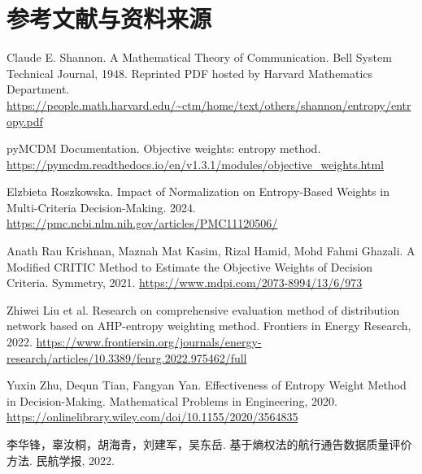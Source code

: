 \documentclass[UTF8,a4paper,12pt]{ctexart}
\begin{document}
\section*{参考文献与资料来源}
\begin{enumerate}[label={[\arabic*]}]
  \item Claude E. Shannon. A Mathematical Theory of Communication. Bell System Technical Journal, 1948. Reprinted PDF hosted by Harvard Mathematics Department. \url{https://people.math.harvard.edu/~ctm/home/text/others/shannon/entropy/entropy.pdf}
  \item pyMCDM Documentation. Objective weights: entropy method. \url{https://pymcdm.readthedocs.io/en/v1.3.1/modules/objective_weights.html}
  \item Elzbieta Roszkowska. Impact of Normalization on Entropy-Based Weights in Multi-Criteria Decision-Making. 2024. \url{https://pmc.ncbi.nlm.nih.gov/articles/PMC11120506/}
  \item Anath Rau Krishnan, Maznah Mat Kasim, Rizal Hamid, Mohd Fahmi Ghazali. A Modified CRITIC Method to Estimate the Objective Weights of Decision Criteria. Symmetry, 2021. \url{https://www.mdpi.com/2073-8994/13/6/973}
  \item Zhiwei Liu et al. Research on comprehensive evaluation method of distribution network based on AHP-entropy weighting method. Frontiers in Energy Research, 2022. \url{https://www.frontiersin.org/journals/energy-research/articles/10.3389/fenrg.2022.975462/full}
  \item Yuxin Zhu, Dequn Tian, Fangyan Yan. Effectiveness of Entropy Weight Method in Decision-Making. Mathematical Problems in Engineering, 2020. \url{https://onlinelibrary.wiley.com/doi/10.1155/2020/3564835}
  \item 李华锋，辜汝桐，胡海青，刘建军，吴东岳. 基于熵权法的航行通告数据质量评价方法. 民航学报, 2022.
\end{enumerate}
\end{document}
